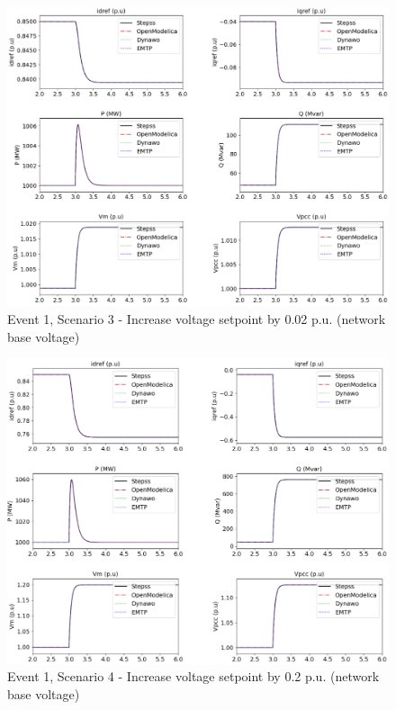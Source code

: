 \documentclass{report}
\begin{document}
\begin{figure}[H]
    \centering
    \includegraphics[scale = 0.61]{Simulation_results/Event1Scenario3.png}
    \caption{Event 1, Scenario 3 - Increase voltage setpoint by 0.02 p.u. (network base voltage)}
    \label{fig:Event1Scenario3}
\end{figure}
\begin{figure}[H]
    \centering
    \includegraphics[scale = 0.61]{Simulation_results/Event1Scenario4.png}
    \caption{Event 1, Scenario 4 - Increase voltage setpoint by 0.2 p.u. (network base voltage)}
    \label{fig:Event1Scenario4}
\end{figure}
\end{document}
